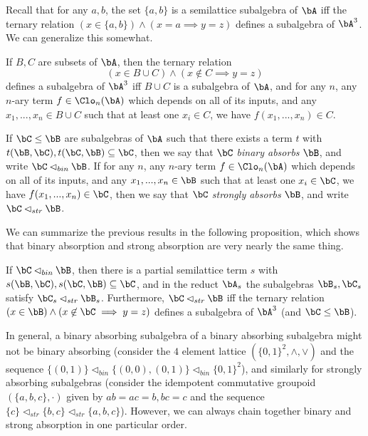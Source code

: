 Recall that for any $a,b$, the set $\{a,b\}$ is a semilattice subalgebra of $\bA$ iff the ternary relation $(x \in \{a,b\}) \wedge (x = a \implies y = z)$ defines a subalgebra of $\bA^3$. We can generalize this somewhat.

\begin{prop} If $B,C$ are subsets of $\bA$, then the ternary relation
\[
(x \in B\cup C) \wedge (x \not\in C \implies y=z)
\]
defines a subalgebra of $\bA^3$ iff $B \cup C$ is a subalgebra of $\bA$, and for any $n$, any $n$-ary term $f \in \Clo_n(\bA)$ which depends on all of its inputs, and any $x_1, ..., x_n \in B\cup C$ such that at least one $x_i \in C$, we have $f(x_1, ..., x_n) \in C$.
\end{prop}

\begin{defn} If $\bC \le \bB$ are subalgebras of $\bA$ such that there exists a term $t$ with $t(\bB,\bC), t(\bC,\bB) \subseteq \bC$, then we say that $\bC$ \emph{binary absorbs} $\bB$, and write $\bC \lhd_{bin} \bB$. If for any $n$, any $n$-ary term $f \in \Clo_n(\bA)$ which depends on all of its inputs, and any $x_1, ..., x_n \in \bB$ such that at least one $x_i \in \bC$, we have $f(x_1, ..., x_n) \in \bC$, then we say that $\bC$ \emph{strongly absorbs} $\bB$, and write $\bC \lhd_{str} \bB$.
\end{defn}

We can summarize the previous results in the following proposition, which shows that binary absorption and strong absorption are very nearly the same thing.

\begin{prop}\label{bin-abs-semi} If $\bC \lhd_{bin} \bB$, then there is a partial semilattice term $s$ with $s(\bB,\bC), s(\bC,\bB) \subseteq \bC$, and in the reduct $\bA_s$ the subalgebras $\bB_s, \bC_s$ satisfy $\bC_s \lhd_{str} \bB_s$. Furthermore, $\bC \lhd_{str} \bB$ iff the ternary relation $(x \in \bB) \wedge (x \not\in \bC \implies y = z)$ defines a subalgebra of $\bA^3$ (and $\bC \le \bB$).
\end{prop}

In general, a binary absorbing subalgebra of a binary absorbing subalgebra might not be binary absorbing (consider the $4$ element lattice $(\{0,1\}^2, \wedge, \vee)$ and the sequence $\{(0,1)\} \lhd_{bin} \{(0,0),(0,1)\} \lhd_{bin} \{0,1\}^2$), and similarly for strongly absorbing subalgebras (consider the idempotent commutative groupoid $(\{a,b,c\},\cdot)$ given by $ab = ac = b, bc = c$ and the sequence $\{c\} \lhd_{str} \{b,c\} \lhd_{str} \{a,b,c\}$). However, we can always chain together binary and strong absorption in one particular order.

